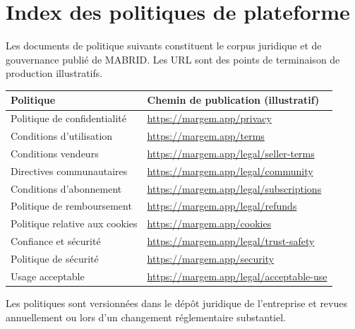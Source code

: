 \chapter{Index des politiques de plateforme}
\label{app:policy-index}

Les documents de politique suivants constituent le corpus juridique et de gouvernance publié de MABRID. Les URL sont des points de terminaison de production illustratifs.

\begin{longtable}{@{}p{5cm}p{8.5cm}@{}}
\toprule
\textbf{Politique} & \textbf{Chemin de publication (illustratif)} \\
\midrule
\endhead
Politique de confidentialité & \url{https://margem.app/privacy} \\
Conditions d'utilisation & \url{https://margem.app/terms} \\
Conditions vendeurs & \url{https://margem.app/legal/seller-terms} \\
Directives communautaires & \url{https://margem.app/legal/community} \\
Conditions d'abonnement & \url{https://margem.app/legal/subscriptions} \\
Politique de remboursement & \url{https://margem.app/legal/refunds} \\
Politique relative aux cookies & \url{https://margem.app/cookies} \\
Confiance et sécurité & \url{https://margem.app/legal/trust-safety} \\
Politique de sécurité & \url{https://margem.app/security} \\
Usage acceptable & \url{https://margem.app/legal/acceptable-use} \\
\bottomrule
\end{longtable}

Les politiques sont versionnées dans le dépôt juridique de l'entreprise et revues annuellement ou lors d'un changement réglementaire substantiel.
